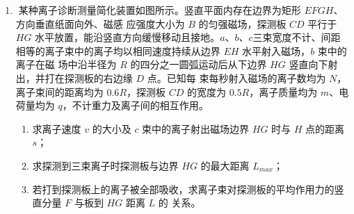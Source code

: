 \begin{enumerate}

\newpage
\item 
某种离子诊断测量简化装置如图所示。竖直平面内存在边界为矩形 $ EFGH $、方向垂直纸面向外、磁感
应强度大小为 $ B $ 的匀强磁场，探测板 $ CD $ 平行于 $ HG $ 水平放置，能沿竖直方向缓慢移动且接地。$ a $、$ b $、$ c $三束宽度不计、间距相等的离子束中的离子均以相同速度持续从边界 $ EH $ 水平射入磁场，$ b $ 束中的离子在磁
场中沿半径为 $ R $ 的四分之一圆弧运动后从下边界 $ HG $ 竖直向下射出，并打在探测板的右边缘 $ D $ 点。已知每
束每秒射入磁场的离子数均为 $ N $，离子束间的距离均为 $ 0.6R $，探测板 $ CD $ 的宽度为 $ 0.5R $，离子质量均为
$ m $、电荷量均为 $ q $，不计重力及离子间的相互作用。
\begin{enumerate}
\item
求离子速度 $ v $ 的大小及 $ c $ 束中的离子射出磁场边界 $ HG $ 时与 $ H $ 点的距离 $ s $；



\item 
求探测到三束离子时探测板与边界 $ HG $ 的最大距离 $ L_{max} $；



\item 
若打到探测板上的离子被全部吸收，求离子束对探测板的平均作用力的竖直分量 $ F $ 与板到 $ HG $ 距离 $ L $ 的
关系。


\end{enumerate}
\begin{figure}[h!]
\flushright

\end{figure}





\end{enumerate}


